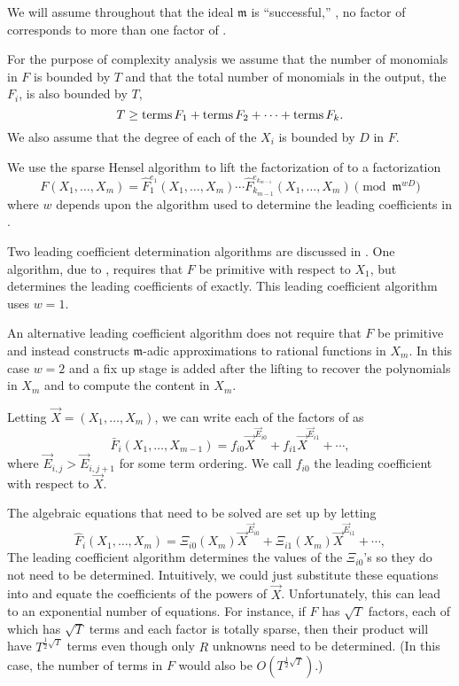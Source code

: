 We will assume throughout that the ideal $\mathfrak{m}$ is
``successful,'' \ie, no factor of 
corresponds to more than one factor of .

For the purpose of complexity analysis we assume that the number
of monomials in $F$ is bounded by $T$ and that the total number of
monomials in the output, the $F_i$, is also bounded by $T$,
\[
T \ge \mathop{\rm terms}\nolimits F_1 + \mathop{\rm terms}\nolimits F_2 + \cdots + \mathop{\rm terms}\nolimits F_k.
\]
We also assume that the degree of each of the $X_i$ is bounded by $D$
in $F$. 

We use the sparse Hensel algorithm to lift the factorization of
 to a factorization
\begin{equation} \label{GF:HenselFact:Eq}
F(X_1, \ldots, X_m) = \hat{F}_1^{e_1}(X_1, \ldots, X_{m}) \cdots
   \hat{F}_{k_{m-1}}^{e_{k_{m-1}}}(X_1, \ldots, X_{m}) 
\pmod{\mathfrak{m}^{wD}}
\end{equation}
where $w$ depends upon the algorithm used to determine the leading
coefficients in .  

Two leading coefficient determination algorithms are discussed in
.  One algorithm, due to {\WangP} \cite{Wang78},
requires that $F$ be primitive with respect to $X_1$, but determines
the leading coefficients of  exactly.  This
leading coefficient algorithm uses $w = 1$.

An alternative leading coefficient algorithm does not require that $F$
be primitive and instead constructs $\mathfrak{m}$-adic approximations to
rational functions in $X_m$.  In this case $w = 2$ and a fix up stage
is added after the lifting to recover the polynomials in $X_m$ and to
compute the content in $X_m$.

Letting $\vec{X} = (X_1, \ldots, X_m)$, we can write each of the
factors of  as
\[
\bar{F}_i(X_1, \ldots, X_{m-1}) = f_{i0} \vec{X}^{\vec{E}_{i0}} + 
f_{i1} \vec{X}^{\vec{E}_{i1}} + \cdots,
\]
where  $\vec{E}_{i,j} > \vec{E}_{i,j+1}$ for some term
ordering.  We call $f_{i0}$ the leading coefficient with respect
to $\vec{X}$.

The algebraic equations that need to be solved are set up by letting 
\begin{equation} \label{GF:mFactor:Eq}
\hat{F}_i(X_1, \ldots,  X_{m}) = 
\Xi_{i0}(X_{m}) \vec{X}^{\vec{E}_{i0}} + 
\Xi_{i1}(X_{m}) \vec{X}^{\vec{E}_{i1}} + \cdots,
\end{equation}
The leading coefficient algorithm determines the values of the
$\Xi_{i0}$'s so they do not need to be determined.  Intuitively, we
could just substitute these equations into
 and equate the coefficients of the powers of
$\vec{X}$.  Unfortunately, this can lead to an exponential number of
equations.  For instance, if $F$ has $\sqrt{T}$ factors, each of which
has $\sqrt{T}$ terms and each factor is totally sparse, then their
product will have $T^{\frac{1}{2}\sqrt{T}}$
terms even though only $R$ unknowns need to be determined.  (In this
case, the number of terms in $F$ would also be
$O(T^{\frac{1}{2}\sqrt{T}})$.)

